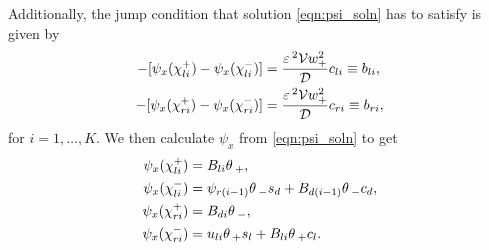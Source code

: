 Additionally, the jump condition that solution \eqref{eqn:psi_soln} has to satisfy is given by
% 
\begin{equation}
\label{eqn:jump_cond}
\begin{split}
\begin{aligned}
  -[\psi_x(\chi_{li}^+) - \psi_x(\chi_{li}^-)] &= \frac{\varepsilon\,^2\mathcal{V} w_+^2}{\mathcal{D}}c_{li} \equiv b_{li},\\
  -[\psi_x(\chi_{ri}^+) - \psi_x(\chi_{ri}^-)] &= \frac{\varepsilon\,^2\mathcal{V} w_+^2}{\mathcal{D}}c_{ri} \equiv b_{ri},
\end{aligned}
\end{split}
\end{equation}
% 
for $i=1,\ldots,K$. We then calculate $\psi_x$ from \eqref{eqn:psi_soln} to get
% 
\begin{equation*}
\begin{split}
\begin{aligned}
  \psi_x(\chi_{li}^+) &= B_{li}\theta\,_+,\\
  \psi_x(\chi_{li}^-) &= \psi_{r(i-1)}\theta\,_-s_d + B_{d(i-1)}\theta\,_-c_d,\\
  \psi_x(\chi_{ri}^+) &= B_{di}\theta\,_-,\\
  \psi_x(\chi_{ri}^-) &= u_{li}\theta\,_+s_l + B_{li}\theta\,_+c_l.
\end{aligned}
\end{split}
\end{equation*}
% 

